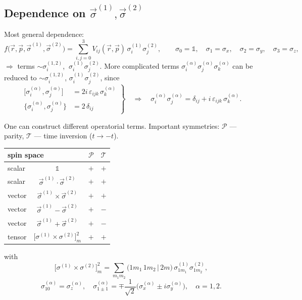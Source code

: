 \documentclass[11pt,a4paper]{article}
\begin{document}
\subsection{Dependence on \texorpdfstring{$\vec\sigma^{(1)},\vec\sigma^{(2)}$}{sigma1, sigma2}}

Most general dependence:
\[
f\big(\vec r,\vec p,\vec\sigma^{(1)},\vec\sigma^{(2)}\big)
=\sum_{i,j=0}^{3}V_{ij}(\vec r,\vec p)\,\sigma_i^{(1)}\sigma_j^{(2)},
\qquad
\sigma_0=\mathbb 1,\quad \sigma_1=\sigma_x,\quad \sigma_2=\sigma_y,\quad \sigma_3=\sigma_z,
\]
$\Rightarrow$ terms $\sim\sigma_i^{(1,2)}$, $\ \sigma_i^{(1)}\sigma_j^{(2)}$.
More complicated terms $\sigma_i^{(\alpha)}\sigma_j^{(\alpha)}\sigma_k^{(\alpha)}$
can be reduced to $\sim\sigma_i^{(1,2)}$, $\sigma_i^{(1)}\sigma_j^{(2)}$, since
\[
\left.
\begin{aligned}
\big[\sigma_i^{(\alpha)},\sigma_j^{(\alpha)}\big]&=2i\,\varepsilon_{ijk}\,\sigma_k^{(\alpha)}\\
\big\{\sigma_i^{(\alpha)},\sigma_j^{(\alpha)}\big\}&=2\,\delta_{ij}
\end{aligned}
\right\}
\quad\Rightarrow\quad
\sigma_i^{(\alpha)}\sigma_j^{(\alpha)}=\delta_{ij}+i\,\varepsilon_{ijk}\,\sigma_k^{(\alpha)} .
\]

One can construct different operatorial terms. Important symmetries:
$\mathcal P$ --- parity, $\mathcal T$ --- time inversion ($t\to-t$).

\begin{center}
\renewcommand{\arraystretch}{1.3}
\begin{tabular}{l c c c}
\hline
\multicolumn{2}{l}{spin space} & $\mathcal P$ & $\mathcal T$ \\
\hline
scalar & $\mathbb 1$ & $+$ & $+$ \\
scalar & $\vec\sigma^{(1)}\!\cdot\vec\sigma^{(2)}$ & $+$ & $+$ \\
vector & $\vec\sigma^{(1)}\times\vec\sigma^{(2)}$ & $+$ & $+$ \\
vector & $\vec\sigma^{(1)}-\vec\sigma^{(2)}$ & $+$ & $-$ \\
vector & $\vec\sigma^{(1)}+\vec\sigma^{(2)}$ & $+$ & $-$ \\
tensor & $\big[\sigma^{(1)}\times\sigma^{(2)}\big]^2_m$ & $+$ & $+$ \\
\hline
\end{tabular}
\end{center}
with
\[
\big[\sigma^{(1)}\times\sigma^{(2)}\big]^2_m=\sum_{m_1m_2}\big(1m_1\,1m_2\,|\,2m\big)\,
\sigma^{(1)}_{1m_1}\sigma^{(2)}_{1m_2},
\]
\[
\sigma^{(\alpha)}_{10}=\sigma^{(\alpha)}_z,\quad
\sigma^{(\alpha)}_{1\pm1}=\mp\frac{1}{\sqrt2}\big(\sigma^{(\alpha)}_x\pm i\sigma^{(\alpha)}_y\big),
\quad \alpha=1,2 .
\]
\end{document}
